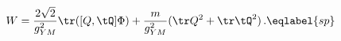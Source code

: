 \begin{equation}
W=\frac{2\sqrt{2}}{g_{YM}^2}\tr([Q,\tQ]\Phi)
+\frac{m} {g_{YM}^2}(\tr Q^2+\tr\tQ^2)\,.
\eqlabel{sp}
\end{equation}

